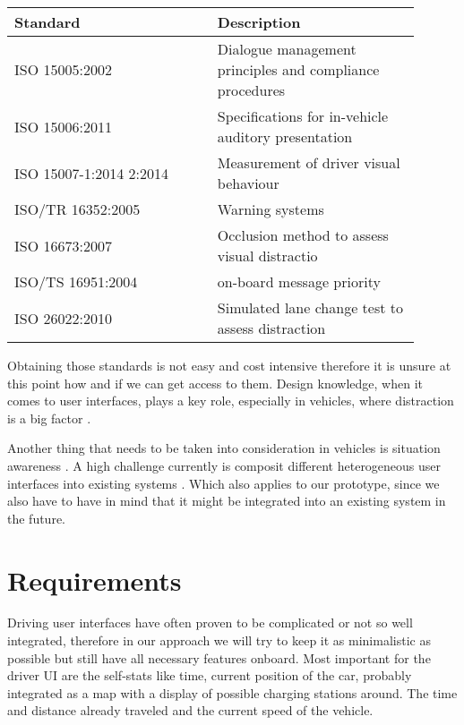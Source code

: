 \documentclass[hidelinks]{sig-alternate}
\begin{document}
\vspace{3mm}
\noindent
\def\arraystretch{1.5}
\begin{tabular}{p{0.45\linewidth} | p{0.45\linewidth}}
\rowcolor{Gray!25}
\textbf{Standard} & \textbf{Description} \\\hline
ISO 15005:2002 & Dialogue management principles and compliance procedures \\\hline
ISO 15006:2011 & Specifications for in-vehicle auditory presentation \\\hline
ISO 15007-1:2014 2:2014 & Measurement of driver visual behaviour \\\hline
ISO/TR 16352:2005 & Warning systems \\\hline
ISO 16673:2007 & Occlusion method to assess visual distractio \\\hline
ISO/TS 16951:2004 & on-board message priority \\\hline
ISO 26022:2010 & Simulated lane change test to assess distraction
\end{tabular}
\vspace{3mm}

Obtaining those standards is not easy and cost intensive therefore it is unsure at this point how and if we can get
access to them. Design knowledge, when it comes to  user interfaces, plays a key role, especially in vehicles, where
distraction is a big factor \cite{Developmentofanautomotiveuserinterfacedesignknowledgesystem}.

Another thing that needs to be taken into consideration in vehicles is situation awareness \cite{Skrypchuk2016}. A
high challenge currently is composit different heterogeneous user interfaces into existing systems
\cite{Holstein2015}. Which also applies to our prototype, since we also have to have in mind that it might be
integrated into an existing system in the future.


\section{Requirements}

Driving user interfaces have often proven to be complicated or not so well integrated, therefore in our approach we
will try to keep it as minimalistic as possible but still have all necessary features onboard. Most important for the
driver UI are the self-stats like time, current position of the car, probably integrated as a map with a display of
possible charging stations around. The time and distance already traveled and the current speed of the vehicle.
\end{document}

